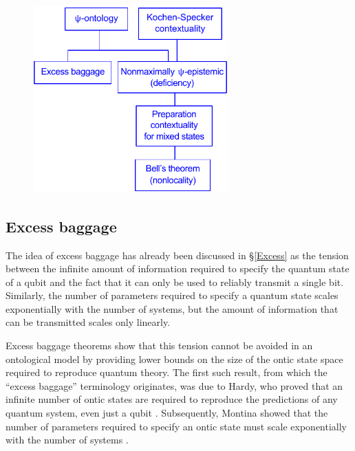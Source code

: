 \documentclass[DIV=calc,paper=a4,fontsize=11pt,twocolumn]{scrartcl} %
\theoremstyle{definition}
\theoremstyle{plain}
\begin{document}
\begin{figure}[t!]
\centering
\includegraphics[width=75mm]{Fig10.pdf}
\caption{}
\end{figure}

\subsection{Excess baggage}

\label{EBT}

The idea of excess baggage has already been discussed in
\S\ref{Excess} as the tension between the infinite amount of
information required to specify the quantum state of a qubit and the
fact that it can only be used to reliably transmit a single bit.
Similarly, the number of parameters required to specify a quantum
state scales exponentially with the number of systems, but the amount
of information that can be transmitted scales only linearly.

Excess baggage theorems show that this tension cannot be avoided in an
ontological model by providing lower bounds on the size of the ontic
state space required to reproduce quantum theory.  The first such
result, from which the ``excess baggage'' terminology originates, was
due to Hardy, who proved that an infinite number of ontic states are
required to reproduce the predictions of any quantum system, even just
a qubit \cite{Hardy2004}.  Subsequently, Montina showed that the
number of parameters required to specify an ontic state must scale
exponentially with the number of systems \cite{Montina2008,
Montina2011}.
\end{document}
